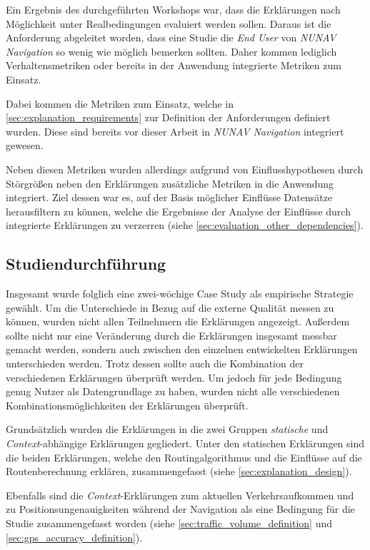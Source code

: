 Ein Ergebnis des durchgeführten Workshops war, dass die Erklärungen nach Möglichkeit unter Realbedingungen evaluiert werden sollen. Daraus ist die Anforderung abgeleitet worden, dass eine Studie die \textit{End User} von \textit{NUNAV Navigation} so wenig wie möglich bemerken sollten. Daher kommen lediglich Verhaltensmetriken oder bereits in der Anwendung integrierte Metriken zum Einsatz.

Dabei kommen die Metriken zum Einsatz, welche in \autoref{sec:explanation_requirements} zur Definition der Anforderungen definiert wurden. Diese sind bereits vor dieser Arbeit in \textit{NUNAV Navigation} integriert gewesen.

Neben diesen Metriken wurden allerdings aufgrund von Einflusshypothesen durch Störgrößen neben den Erklärungen zusätzliche Metriken in die Anwendung integriert. Ziel dessen war es, auf der Basis möglicher Einflüsse Datensätze herausfiltern zu können, welche die Ergebnisse der Analyse der Einflüsse durch integrierte Erklärungen zu verzerren (siehe \autoref{sec:evaluation_other_dependencies}).

\subsection{Studiendurchführung}

Insgesamt wurde folglich eine zwei-wöchige Case Study als empirische Strategie gewählt. Um die Unterschiede in Bezug auf die externe Qualität messen zu können, wurden nicht allen Teilnehmern die Erklärungen angezeigt. Außerdem sollte nicht nur eine Veränderung durch die Erklärungen insgesamt messbar gemacht werden, sondern auch zwischen den einzelnen entwickelten Erklärungen unterschieden werden. Trotz dessen sollte auch die Kombination der verschiedenen Erklärungen überprüft werden. Um jedoch für jede Bedingung genug Nutzer als Datengrundlage zu haben, wurden nicht alle verschiedenen Kombinationsmöglichkeiten der Erklärungen überprüft.

Grundsätzlich wurden die Erklärungen in die zwei Gruppen \textit{statische} und \textit{Context}-abhängige Erklärungen gegliedert. Unter den statischen Erklärungen sind die beiden Erklärungen, welche den Routingalgorithmus und die Einflüsse auf die Routenberechnung erklären, zusammengefasst (siehe \autoref{sec:explanation_design}).

Ebenfalls sind die \textit{Context}-Erklärungen zum aktuellen Verkehrsaufkommen und zu Positionsungenauigkeiten während der Navigation als eine Bedingung für die Studie zusammengefasst worden (siehe \autoref{sec:traffic_volume_definition} und \autoref{sec:gps_accuracy_definition}).

